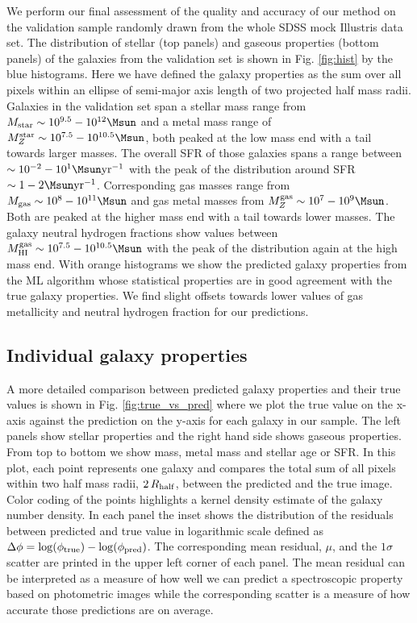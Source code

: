 \documentclass[conference]{IEEEtran}
\begin{document}
We perform our final assessment of the quality and accuracy of our method on the validation sample randomly drawn from the whole SDSS mock Illustris data set. The distribution of stellar (top panels) and gaseous properties (bottom panels) of the galaxies from the validation set is shown in Fig. \ref{fig:hist} by the blue histograms. Here we have defined the galaxy properties as the sum over all pixels within an ellipse of semi-major axis length of two projected half mass radii. Galaxies in the validation set span a stellar mass range from $M_{\rm star}\sim10^{9.5}-10^{12}\Msun$ and a metal mass range of $M_{Z}^{\rm star}\sim10^{7.5}-10^{10.5}\Msun$, both peaked at the low mass end with a tail towards larger masses. The overall SFR of those galaxies spans a range between $\sim10^{-2}-10^{1}\Msun\rm{yr}^{-1}$ with the peak of the distribution around SFR$\sim1-2\Msun\rm{yr}^{-1}$. Corresponding gas masses range from $M_{\rm gas}\sim10^{8}-10^{11}\Msun$ and gas metal masses from $M_{Z}^{\rm gas}\sim10^{7}-10^{9}\Msun$. Both are peaked at the higher mass end with a tail towards lower masses. The galaxy neutral hydrogen fractions show values between $M_{\rm HI}^{\rm gas}\sim10^{7.5}-10^{10.5}\Msun$ with the peak of the distribution again at the high mass end. 
With orange histograms we show the predicted galaxy properties from the ML algorithm whose statistical properties are in good agreement with the true galaxy properties. We find slight offsets towards lower values of gas metallicity and neutral hydrogen fraction for our predictions.

\subsection{Individual galaxy properties}

A more detailed comparison between predicted galaxy properties and their true values is shown in Fig. \ref{fig:true_vs_pred} where we plot the true value on the x-axis against the prediction on the y-axis for each galaxy in our sample. The left panels show stellar properties and the right hand side shows gaseous properties. From top to bottom we show mass, metal mass and stellar age or SFR. In this plot, each point represents one galaxy and compares the total sum of all pixels within two half mass radii, $2\,R_{\rm half}$, between the predicted and the true image. Color coding of the points highlights a kernel density estimate of the galaxy number density. In each panel the inset shows the distribution of the residuals between predicted and true value in logarithmic scale defined as $\Delta\phi=\log(\phi_{\rm true})-\log(\phi_{\rm pred})$. The corresponding mean residual, $\mu$, and the $1\sigma$ scatter are printed in the upper left corner of each panel. The mean residual can be interpreted as a measure of how well we can predict a spectroscopic property based on photometric images while the corresponding scatter is a measure of how accurate those predictions are on average.
	
\end{document}
